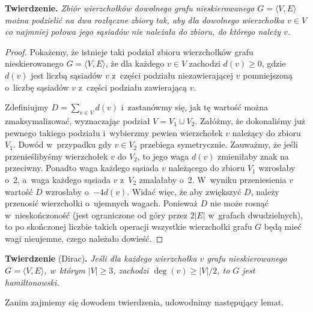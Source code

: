 \subproblem %
\textsf{\textbf{Twierdzenie.}} \textit{Zbiór wierzchołków dowolnego grafu nieskierowanego\/ $G=\langle V,E\rangle$ można podzielić na dwa rozłączne zbiory tak, aby dla dowolnego wierzchołka\/ $v\in V$ co najmniej połowa jego sąsiadów nie należała do zbioru, do którego należy\/ $v$.}
\begin{proof}
Pokażemy, że istnieje taki podział zbioru wierzchołków grafu nieskierowanego $G=\langle V,E\rangle$, że dla każdego $v\in V$\! zachodzi $d(v)\ge0$, gdzie $d(v)$ jest liczbą sąsiadów $v$ z~części podziału niezawierającej $v$ pomniejszoną o~liczbę sąsiadów $v$ z~części podziału zawierającą $v$.

Zdefiniujmy $D=\sum_{v\in V}d(v)$ i~zastanówmy się, jak tę wartość można zmaksymalizować, wyznaczając podział $V=V_1\cup V_2$.
Załóżmy, że dokonaliśmy już pewnego takiego podziału i~wybierzmy pewien wierzchołek $v$ należący do zbioru $V_1$.
Dowód w~przypadku gdy $v\in V_2$ przebiega symetrycznie.
Zauważmy, że jeśli przenieślibyśmy wierzchołek $v$ do $V_2$, to jego waga $d(v)$ zmieniłaby znak na przeciwny.
Ponadto waga każdego sąsiada $v$ należącego do zbioru $V_1$ wzrosłaby o~2, a~waga każdego sąsiada $v$ z~$V_2$ zmalałaby o~2.
W~wyniku przeniesienia $v$ wartość $D$ wzrosłaby o~$-4d(v)$.
Widać więc, że aby zwiększyć $D$, należy przenosić wierzchołki o~ujemnych wagach.
Ponieważ $D$ nie może rosnąć w~nieskończoność (jest ograniczone od góry przez $2|E|$ w~grafach dwudzielnych), to po skończonej liczbie takich operacji wszystkie wierzchołki grafu $G$ będą mieć wagi nieujemne, czego należało dowieść.
\end{proof}

\subproblem %
\textsf{\textbf{Twierdzenie} (Dirac)\textbf{.}} \textit{Jeśli dla każdego wierzchołka\/ $v$ grafu nieskierowanego\/ $G=\langle V,E\rangle$, w~którym\/ $|V|\ge3$, zachodzi\/ $\deg(v)\ge|V|/2$, to\/ $G$ jest hamiltonowski.}

\medskip
\noindent Zanim zajmiemy się dowodem twierdzenia, udowodnimy następujący lemat.

